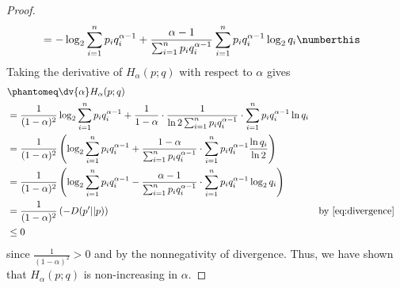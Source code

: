 \documentclass[
  coursecode={MTHE 474},
  assignmentname={Homework \homeworknumber},
  studentnumber=20053722,
  name={Bryan Hoang}
]{
  ltxanswer%
}
\begin{document}
\begin{questions}
\begin{parts}
\begin{solution}
\begin{proof}
\begin{align*}
             &= -\log_{2} \sum_{i=1}^{n} p_{i}q_{i}^{\alpha-1} + \frac{\alpha-1}{\sum_{i=1}^{n} p_{i}q_{i}^{\alpha-1}} \sum_{i=1}^{n} p_{i}q_{i}^{\alpha-1} \log_{2} q_{i}\numberthis\label{eq:divergence}
          \end{align*}
          Taking the derivative of \(H_{\alpha}(p;q)\) with respect to \(\alpha\) gives
          \begin{align*}
             &\phantomeq \dv{\alpha} H_{\alpha}(p;q)                                                                                                                                                                                                           \\
             &= \frac{1}{(1-\alpha)^2} \log_{2} \sum_{i=1}^{n} p_{i}q_{i}^{\alpha-1} + \frac{1}{1-\alpha} \cdot \frac{1}{\ln 2 \sum_{i=1}^{n} p_{i}q_{i}^{\alpha-1}} \cdot \sum_{i=1}^{n} p_{i}q_{i}^{\alpha-1}\ln q_{i}                                       \\
             &= \frac{1}{(1-\alpha)^2} \left(\log_{2} \sum_{i=1}^{n} p_{i}q_{i}^{\alpha-1} + \frac{1-\alpha}{\sum_{i=1}^{n} p_{i}q_{i}^{\alpha-1}} \cdot \sum_{i=1}^{n} p_{i}q_{i}^{\alpha-1}\frac{\ln q_{i}}{\ln 2}\right)                                    \\
             &= \frac{1}{(1-\alpha)^2} \left(\log_{2} \sum_{i=1}^{n} p_{i}q_{i}^{\alpha-1} - \frac{\alpha-1}{\sum_{i=1}^{n} p_{i}q_{i}^{\alpha-1}} \cdot \sum_{i=1}^{n} p_{i}q_{i}^{\alpha-1}\log_{2} q_{i}\right)                                             \\
             &= \frac{1}{(1-\alpha)^2} \left(-D(p^{\prime}||p)\right)                                                                                                                                                       & &\text{by~\eqref{eq:divergence}} \\
             &\le 0
          \end{align*}
          since \(\frac{1}{(1-\alpha)^2} > 0\) and by the nonnegativity of divergence. Thus, we have shown that \(H_{\alpha}(p;q)\) is non-increasing in \(\alpha\).
        \end{proof}
      \end{solution}
    \end{parts}
  \end{questions}
\end{document}

